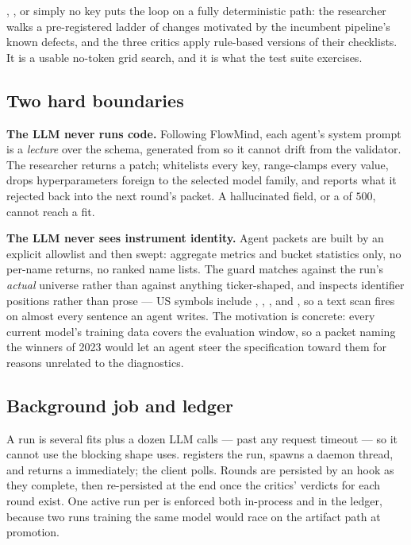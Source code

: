 \documentclass[11pt]{article}
\begin{document}
\begin{notebox}
, , or simply no key
puts the loop on a fully deterministic path: the researcher walks a pre-registered
ladder of changes motivated by the incumbent pipeline's known defects, and the three
critics apply rule-based versions of their checklists. It is a usable no-token grid
search, and it is what the test suite exercises.
\end{notebox}

\subsection{Two hard boundaries}

\textbf{The LLM never runs code.} Following FlowMind, each agent's system prompt is a
\emph{lecture} over the  schema, generated from
 so it cannot drift from the validator. The
researcher returns a patch;  whitelists every key, range-clamps
every value, drops hyperparameters foreign to the selected model family, and reports
what it rejected back into the next round's packet. A hallucinated field, or a
 of $500$, cannot reach a fit.

\textbf{The LLM never sees instrument identity.} Agent packets are built by an
explicit allowlist and then swept: aggregate metrics and bucket statistics only, no
per-name returns, no ranked name lists. The guard matches against the run's
\emph{actual} universe rather than against anything ticker-shaped, and inspects
identifier positions rather than prose --- US symbols include , ,
,  and , so a text scan fires on almost every sentence
an agent writes. The motivation is concrete: every current model's training data
covers the evaluation window, so a packet naming the winners of 2023 would let an
agent steer the specification toward them for reasons unrelated to the diagnostics.

\subsection{Background job and ledger}

A run is several fits plus a dozen LLM calls --- past any request timeout --- so it
cannot use the blocking shape  uses.  registers
the run, spawns a daemon thread, and returns a  immediately; the client
polls. Rounds are persisted by an  hook as they complete, then
re-persisted at the end once the critics' verdicts for each round exist. One active
run per  is enforced both in-process and in the ledger,
because two runs training the same model would race on the artifact path at
promotion.
\end{document}
